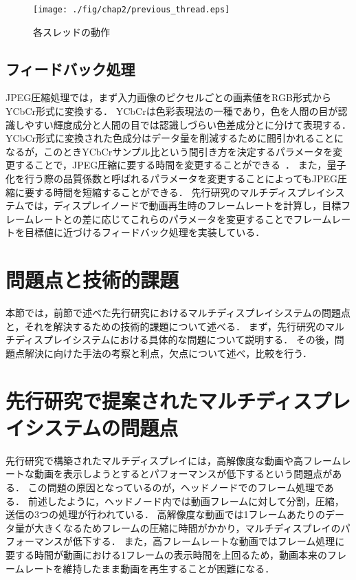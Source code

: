   \begin{center}
    \begin{figure}[H]
        \hspace*{\fill}
        \texttt{[image: ./fig/chap2/previous\_thread.eps]}
        \hspace*{\fill}
        \caption{各スレッドの動作}
        \label{thread_flow}
    \end{figure}
    \end{center}
   

\subsection*{フィードバック処理}

JPEG圧縮処理では，まず入力画像のピクセルごとの画素値をRGB形式からYCbCr形式に変換する．
YCbCrは色彩表現法の一種であり，色を人間の目が認識しやすい輝度成分と人間の目では認識しづらい色差成分とに分けて表現する\cite{YCbCr}．
YCbCr形式に変換された色成分はデータ量を削減するために間引かれることになるが，このときYCbCrサンプル比という間引き方を決定するパラメータを変更することで，JPEG圧縮に要する時間を変更することができる~\cite{jpeg2}．
また，量子化を行う際の品質係数と呼ばれるパラメータを変更することによってもJPEG圧縮に要する時間を短縮することができる．
先行研究のマルチディスプレイシステムでは，ディスプレイノードで動画再生時のフレームレートを計算し，目標フレームレートとの差に応じてこれらのパラメータを変更することでフレームレートを目標値に近づけるフィードバック処理を実装している．

\section{問題点と技術的課題}

本節では，前節で述べた先行研究におけるマルチディスプレイシステムの問題点と，それを解決するための技術的課題について述べる．
まず，先行研究のマルチディスプレイシステムにおける具体的な問題について説明する．
その後，問題点解決に向けた手法の考察と利点，欠点について述べ，比較を行う．

\section*{先行研究で提案されたマルチディスプレイシステムの問題点}

先行研究で構築されたマルチディスプレイには，高解像度な動画や高フレームレートな動画を表示しようとするとパフォーマンスが低下するという問題点がある．
この問題の原因となっているのが，ヘッドノードでのフレーム処理である．
前述したように，ヘッドノード内では動画フレームに対して分割，圧縮，送信の3つの処理が行われている．
高解像度な動画では1フレームあたりのデータ量が大きくなるためフレームの圧縮に時間がかかり，マルチディスプレイのパフォーマンスが低下する．
また，高フレームレートな動画ではフレーム処理に要する時間が動画における1フレームの表示時間を上回るため，動画本来のフレームレートを維持したまま動画を再生することが困難になる．

